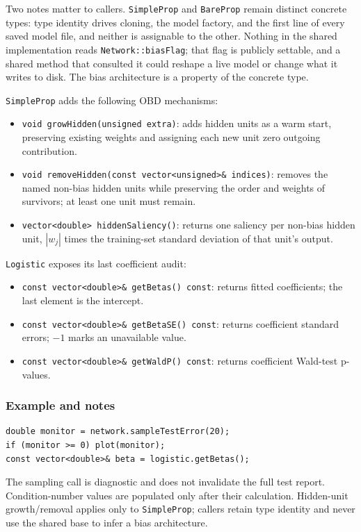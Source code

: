 Two notes matter to callers.  \texttt{SimpleProp} and \texttt{BareProp} remain
distinct concrete types: type identity drives cloning, the model factory, and
the first line of every saved model file, and neither is assignable to the
other.  Nothing in the shared implementation reads
\texttt{Network::biasFlag}; that flag is publicly settable, and a shared method
that consulted it could reshape a live model or change what it writes to disk.
The bias architecture is a property of the concrete type.

\texttt{SimpleProp} adds the following OBD mechanisms:

\begin{itemize}
\item \texttt{void growHidden(unsigned extra)}: adds hidden units as a warm
      start, preserving existing weights and assigning each new unit zero
      outgoing contribution.
\item \texttt{void removeHidden(const vector<unsigned>\& indices)}: removes
      the named non-bias hidden units while preserving the order and weights of
      survivors; at least one unit must remain.
\item \texttt{vector<double> hiddenSaliency()}: returns one saliency per
      non-bias hidden unit, $|w_j|$ times the training-set standard deviation of
      that unit's output.
\end{itemize}

\texttt{Logistic} exposes its last coefficient audit:

\begin{itemize}
\item \texttt{const vector<double>\& getBetas() const}: returns fitted
      coefficients; the last element is the intercept.
\item \texttt{const vector<double>\& getBetaSE() const}: returns coefficient
      standard errors; $-1$ marks an unavailable value.
\item \texttt{const vector<double>\& getWaldP() const}: returns coefficient
      Wald-test p-values.
\end{itemize}

\subsubsection{Example and notes}
\begin{verbatim}
double monitor = network.sampleTestError(20);
if (monitor >= 0) plot(monitor);
const vector<double>& beta = logistic.getBetas();
\end{verbatim}
The sampling call is diagnostic and does not invalidate the full test report.
Condition-number values are populated only after their calculation.  Hidden-unit
growth/removal applies only to \texttt{SimpleProp}; callers retain type identity
and never use the shared base to infer a bias architecture.


